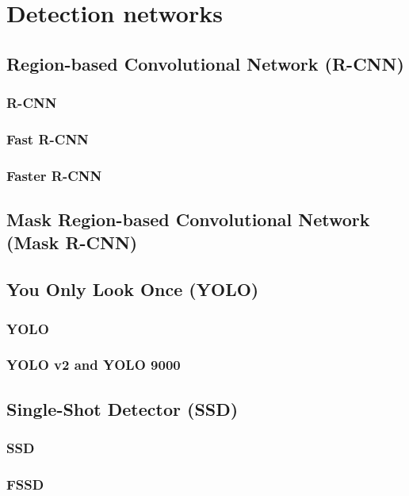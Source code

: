 
\section{Detection networks}
\label{chapt:models}


\subsection*{Region-based Convolutional Network (R-CNN)}
\subsubsection{R-CNN}
\cite{bib:rcnn}

\subsubsection{Fast R-CNN}

\subsubsection{Faster R-CNN}

\subsection*{Mask Region-based Convolutional Network (Mask R-CNN)}

\subsection*{You Only Look Once (YOLO)}
\subsubsection{YOLO}
\label{sec:yolo}
\subsubsection{YOLO v2 and YOLO 9000}

\subsection*{Single-Shot Detector (SSD)}
\label{sec:ssd}
\subsubsection{SSD}
\subsubsection{FSSD}
